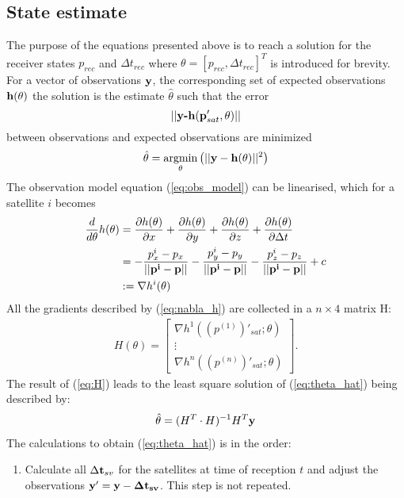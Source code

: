 \documentclass[]{article}
\begin{document}
\subsection{State estimate}
The purpose of the equations presented above is to reach a solution for the receiver states $p_{rec}$ and $\Delta t_{rec}$ where $\theta=\left[p_{rec}, \Delta t_{rec}\right]^T$ is introduced for brevity. For a vector of observations $\bf y$, the corresponding set of expected observations ${\bf h}(\theta)$ the solution is the estimate $\hat{\theta}$ such that the error
\begin{equation}
||\textbf{y-h}({\bf p}'_{sat},\theta)||
\end{equation} 
between observations and expected observations are minimized
\begin{align}\label{eq:theta_hat}
\hat{\bf \theta}=\operatorname*{argmin}_{\bf \theta}\left(||{\bf y-h}({\bf \theta})||^2\right)
\end{align}
The observation model equation (\ref{eq:obs_model}) can be linearised, which for a satellite $i$ becomes 
\begin{align}
\frac{d}{d \theta}h(\theta)&=\frac{\partial h(\theta)}{\partial x}+\frac{\partial h(\theta)}{\partial y}+ \frac{\partial h(\theta)}{\partial z}+\frac{\partial h(\theta)}{\partial \Delta t} \nonumber \\
						   &=-\frac{p^i_x-p_x}{||\bf p^i-p||}-\frac{p^i_y-p_y}{||\bf p^i-p||}-\frac{p^i_z-p_z}{||\bf p^i-p||}+c \nonumber \\
						   &:=\nabla h^i(\theta)\label{eq:nabla_h}
\end{align}
All the gradients described by (\ref{eq:nabla_h}) are collected in a $n\times 4$ matrix H:
\begin{align}\label{eq:H}
H(\theta)=\begin{bmatrix}
\nabla h^1((p^{(1)})'_{sat};\theta) \\
\vdots \\
\nabla h^n((p^{(n)})'_{sat};\theta)
\end{bmatrix}.
\end{align}
The result of (\ref{eq:H}) leads to the least square solution of (\ref{eq:theta_hat}) being described by:
\begin{align}
\hat{\theta}=(H^T\cdot H)^{-1}H^T{\bf y}
\end{align}
The calculations to obtain (\ref{eq:theta_hat}) is in the order:
\begin{enumerate}
\item Calculate all $\Delta {\bf t}_{sv}$ for the satellites at time of reception $t$ and adjust the observations ${\bf y}'= \bf{y} -\Delta {\bf t}_{sv}$. This step is not repeated.
\end{enumerate}
\end{document}
